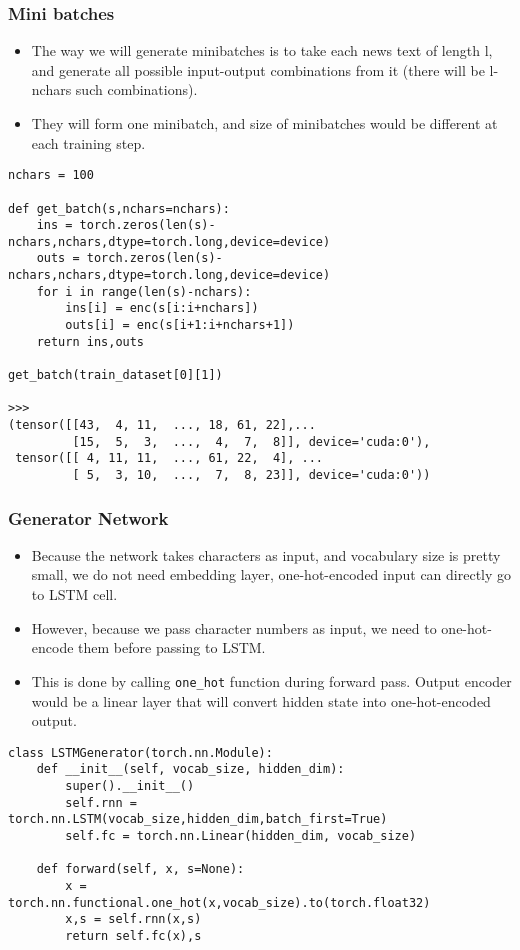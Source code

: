 \begin{frame}[fragile] \frametitle{Mini batches}

\begin{itemize}
\item The way we will generate minibatches is to take each news text of length l, and generate all possible input-output combinations from it (there will be l-nchars such combinations). 
\item They will form one minibatch, and size of minibatches would be different at each training step.
\end{itemize}

\begin{lstlisting}
nchars = 100

def get_batch(s,nchars=nchars):
    ins = torch.zeros(len(s)-nchars,nchars,dtype=torch.long,device=device)
    outs = torch.zeros(len(s)-nchars,nchars,dtype=torch.long,device=device)
    for i in range(len(s)-nchars):
        ins[i] = enc(s[i:i+nchars])
        outs[i] = enc(s[i+1:i+nchars+1])
    return ins,outs

get_batch(train_dataset[0][1])

>>>
(tensor([[43,  4, 11,  ..., 18, 61, 22],...
         [15,  5,  3,  ...,  4,  7,  8]], device='cuda:0'),
 tensor([[ 4, 11, 11,  ..., 61, 22,  4], ...
         [ 5,  3, 10,  ...,  7,  8, 23]], device='cuda:0'))
\end{lstlisting}

\end{frame}

\begin{frame}[fragile] \frametitle{Generator Network}

\begin{itemize}
\item Because the network takes characters as input, and vocabulary size is pretty small, we do not need embedding layer, one-hot-encoded input can directly go to LSTM cell. 
\item However, because we pass character numbers as input, we need to one-hot-encode them before passing to LSTM. 
\item This is done by calling \lstinline|one_hot| function during forward pass. Output encoder would be a linear layer that will convert hidden state into one-hot-encoded output.
\end{itemize}

\begin{lstlisting}
class LSTMGenerator(torch.nn.Module):
    def __init__(self, vocab_size, hidden_dim):
        super().__init__()
        self.rnn = torch.nn.LSTM(vocab_size,hidden_dim,batch_first=True)
        self.fc = torch.nn.Linear(hidden_dim, vocab_size)

    def forward(self, x, s=None):
        x = torch.nn.functional.one_hot(x,vocab_size).to(torch.float32)
        x,s = self.rnn(x,s)
        return self.fc(x),s
\end{lstlisting}

\end{frame}


